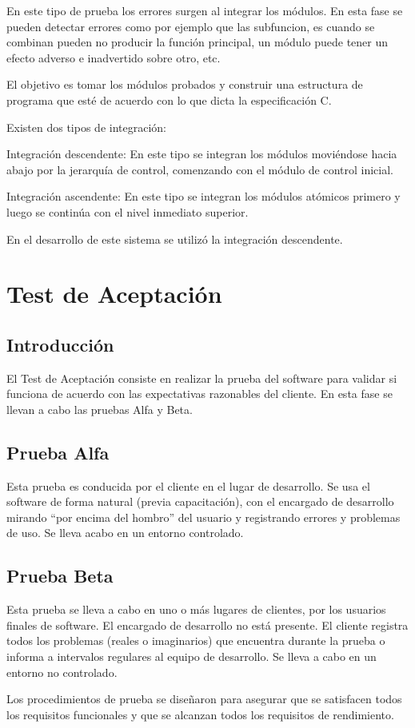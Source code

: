 En este tipo de prueba los errores surgen al integrar los módulos. En esta fase se pueden detectar errores como por ejemplo que las subfuncion, es cuando se combinan pueden no producir la función principal, un módulo puede tener un efecto adverso e inadvertido sobre otro, etc.

    El objetivo es tomar los módulos probados y construir una estructura de programa que esté de acuerdo con lo que dicta la especificación C.
    
    Existen dos tipos de integración:

Integración descendente: En este tipo se integran los módulos moviéndose hacia abajo por la jerarquía de control, comenzando con el módulo de control inicial.

Integración ascendente: En este tipo se integran los módulos atómicos primero y luego se continúa con el nivel inmediato superior.

En el desarrollo de este sistema se utilizó la integración descendente.

    

\section{Test de Aceptación}

\subsection{Introducción}

El Test de Aceptación consiste en realizar la prueba del software para validar si funciona de acuerdo con las expectativas razonables del cliente. En esta fase se llevan a cabo las pruebas Alfa y Beta.

\subsection{Prueba Alfa}

Esta prueba es conducida por el cliente en el lugar de desarrollo. Se usa el software de forma natural (previa capacitación), con el encargado de desarrollo mirando “por encima del hombro” del usuario y registrando errores y problemas de uso. Se lleva acabo en un entorno controlado.
\subsection{Prueba Beta}

Esta prueba se lleva a cabo en uno o más lugares de clientes, por los usuarios finales de software. El encargado de desarrollo no está presente. El cliente registra todos los problemas (reales o imaginarios) que  encuentra durante la prueba o informa a intervalos regulares al equipo de desarrollo. Se lleva a cabo en un entorno no controlado.

Los procedimientos de prueba se diseñaron para asegurar que se satisfacen todos los requisitos funcionales y que se alcanzan todos los requisitos de rendimiento.